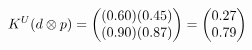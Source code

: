 \documentclass[preview]{standalone}
\begin{document}
\begin{align*}
\special{dvisvgm:raw <g id='unique000'>}K^U(d \otimes p) = \begin{pmatrix} (0.60)(0.45) \\ (0.90)(0.87) \end{pmatrix} = \begin{pmatrix} 0.27 \\ 0.79 \end{pmatrix}\special{dvisvgm:raw </g>}
\end{align*}
\end{document}
